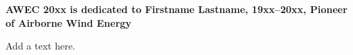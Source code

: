 \label{awec:dedication}
\abstractpage%
{%
}
{%
}
{%
}
{
{\Large\bfseries
AWEC 20xx is dedicated to Firstname Lastname, 19xx--20xx, Pioneer of Airborne Wind Energy
}\\[2mm]
%
%
%
%
%
%
}
%
%
%
{
\begin{multicols}{2}
%
%
%
%
Add a text here.


%
%
%
%
\mbox{}
\end{multicols}
}
